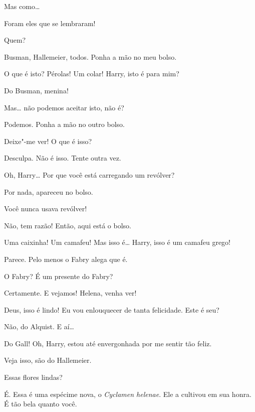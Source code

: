 Mas como\ldots{}

 Foram eles que se lembraram!

 Quem?

 Busman, Hallemeier, todos. Ponha a mão no meu bolso.

  O que é isto?  Pérolas! Um colar! Harry, isto é para mim?

 Do Busman, menina!

 Mas\ldots{} não podemos aceitar isto, não é?

 Podemos. Ponha a mão no outro bolso.

 Deixe"-me ver!  O que é isso?

 Desculpa.  Não é
isso. Tente outra vez.

 Oh, Harry\ldots{} Por que você está carregando um revólver?

 Por nada, apareceu no bolso.

 Você nunca usava revólver!

 Não, tem razão! Então, aqui está o bolso.

  Uma caixinha!  Um camafeu! Mas
isso é\ldots{} Harry, isso é um camafeu grego!

 Parece. Pelo menos o Fabry alega que é.

 O Fabry? É um presente do Fabry?

 Certamente.  E vejamos! Helena, venha ver!

  Deus, isso é lindo!  Eu
vou enlouquecer de tanta felicidade. Este é seu?

  Não, do Alquist. E aí\ldots{}

 Do Gall!  Oh, Harry, estou até
envergonhada por me sentir tão feliz.

 Veja isso, são do Hallemeier.

 Essas flores lindas?

 É. Essa é uma espécime nova, o \textit{Cyclamen helenae}. Ele a cultivou em sua
honra. É tão bela quanto você.

